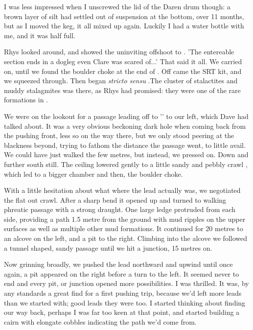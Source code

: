 I was less impressed when I unscrewed the lid of the Daren drum though: a brown layer of silt had settled out of suspension at the bottom, over 11 months, but as I moved the keg, it all mixed up again. Luckily I had a water bottle with me, and it was half full.

Rhys looked around, and showed the uninviting offshoot to . 'The entereable section ends in a dogleg even Clare was scared of...' That said it all. We carried on, until we found the boulder choke at the end of . Off came the SRT kit, and we squeezed through. 
Then began  \emph{stricto sensu} .The cluster of stalactites and muddy stalagmites was there, as Rhys had promised: they were one of the rare formations in . 

We were on the lookout for a passage leading off to '' to our left, which Dave had talked about. It was a very obvious beckoning dark hole when coming back from the pushing front, less so on the way there, but we only stood peering at the blackness beyond, trying to fathom the distance the passage went, to little avail. We could have just walked the few metres, but instead, we pressed on. Down and further south still. The ceiling lowered gently to a little sandy and pebbly crawl , which led to a bigger chamber and then, the boulder choke.



With a little hesitation about what where the lead actually was, we negotiated the flat out crawl. After a sharp bend it opened up and turned to walking phreatic passage with a strong draught. One large ledge protruded from each side, providing a path 1.5 metre from the ground with mud ripples on the upper surfaces as well as multiple other mud formations. It continued for 20 metres to an alcove on the left, and a pit to the right. Climbing into the alcove we followed a tunnel shaped, sandy passage until we hit a junction, 15 metres on. 

Now grinning broadly, we pushed the lead northward and upwind until once again, a pit appeared on the right before a turn to the left. It seemed never to end and every pit, or junction opened more possibilities. I was thrilled. It was, by any standards a great find for a first pushing trip, because we'd left more leads than we started with; good leads they were too. I started thinking about finding our way back, perhaps I was far too keen at that point, and started building a cairn with elongate cobbles indicating the path we'd come from. 

